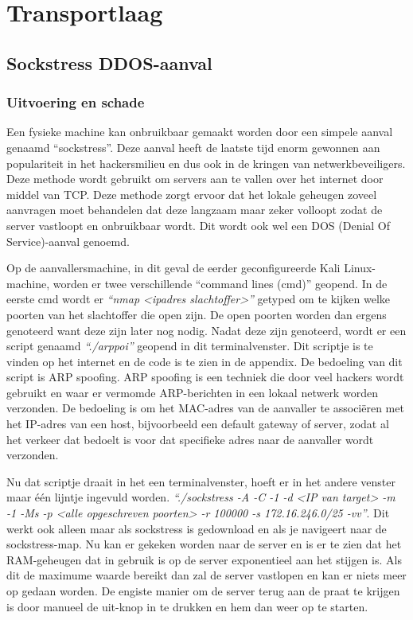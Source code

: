 \documentclass[pdftex,a4paper,12pt]{report}
\begin{document}
\section{Transportlaag}
\subsection{Sockstress DDOS-aanval}
\subsubsection{Uitvoering en schade}
Een fysieke machine kan onbruikbaar gemaakt worden door een simpele aanval genaamd "`sockstress"'. Deze aanval heeft de laatste tijd enorm gewonnen aan populariteit in het hackersmilieu en dus ook in de kringen van netwerkbeveiligers. Deze methode wordt gebruikt om servers aan te vallen over het internet door middel van TCP. Deze methode zorgt ervoor dat het lokale geheugen zoveel aanvragen moet behandelen dat deze langzaam maar zeker volloopt zodat de server vastloopt en onbruikbaar wordt. Dit wordt ook wel een DOS (Denial Of Service)-aanval genoemd. \newline 

Op de aanvallersmachine, in dit geval de eerder geconfigureerde Kali Linux-machine, worden er twee verschillende "`command lines (cmd)"' geopend. In de eerste cmd wordt er \textit{"`nmap <ipadres slachtoffer>"'} getyped om te kijken welke poorten van het slachtoffer die open zijn. De open poorten worden dan ergens genoteerd want deze zijn later nog nodig. Nadat deze zijn genoteerd, wordt er een script genaamd \textit{"`./arppoi"'} geopend in dit terminalvenster. Dit scriptje is te vinden op het internet en de code is te zien in de appendix. De bedoeling van dit script is ARP spoofing. ARP spoofing is een techniek die door veel hackers wordt gebruikt en waar er vermomde ARP-berichten in een lokaal netwerk worden verzonden. De bedoeling is om het MAC-adres van de aanvaller te associëren met het IP-adres van een host, bijvoorbeeld een default gateway of server, zodat al het verkeer dat bedoelt is voor dat specifieke adres naar de aanvaller wordt verzonden. \newline 

Nu dat scriptje draait in het een terminalvenster, hoeft er in het andere venster maar één lijntje ingevuld worden. \textit{"`./sockstress -A -C -1 -d <IP van target> -m -1 -Ms -p <alle opgeschreven poorten> -r 100000 -s 172.16.246.0/25 -vv"'}. Dit werkt ook alleen maar als sockstress is gedownload en als je navigeert naar de sockstress-map. Nu kan er gekeken worden naar de server en is er te zien dat het RAM-geheugen dat in gebruik is op de server exponentieel aan het stijgen is. Als dit de maximume waarde bereikt dan zal de server vastlopen en kan er niets meer op gedaan worden. De engiste manier om de server terug aan de praat te krijgen is door manueel de uit-knop in te drukken en hem dan weer op te starten.
\end{document}
